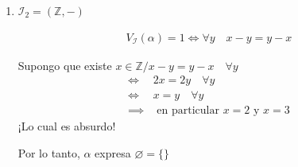 \begin{itemize}
\begin{enumerate}[label=\alph*)]
\begin{itemize}
                    \item $\impliedby$) Sea $X = x_{11} \, Id$. ¿Conmuta con todo
                        $Y$?

                        \begin{align*}
                            X Y &= x_{11} \, \underbrace{Id \, Y}_{Y} 
                            = x_{11} Y \\
                            &= Y x_{11} = \underbrace{Y \, Id}_{Y} \, x_{11} 
                            \notamath{Por conmutatividad con un escalar} \\
                            &= Y \underbrace{(Id \, x_{11})}_{X} = YX 
                            \notamath{Por asociatividad} \\
                        \end{align*}
                    \end{itemize}

                    Por lo tanto $\alpha$ expresa 
                    $A = \{ M \in \mathbb{R}^{2\times 2} / 
                    M = m \, Id, m \in \mathbb{R} \}$


                \item $\mathcal{I}_2 = (\mathbb{Z}, -)$

                    \begin{gather*}
                        V_{\mathcal{I}}(\alpha) = 1 \iff \forall y \quad x-y=y-x
                    \end{gather*}

                    Supongo que existe $x \in \mathbb{Z} / 
                    x - y = y - x \quad \forall y$
                    \begin{align*}
                        \iff & 2x = 2y \quad \forall y \\
                        \iff & x = y \quad \forall y \\
                        \implies & \text{ en particular } x = 2 \text{ y } x = 3
                    \end{align*}
                    ¡Lo cual es absurdo!

                    \begin{center}
                        Por lo tanto, $\alpha$ expresa $\varnothing = \{\}$
                    \end{center}
            \end{enumerate}
    \end{itemize}

